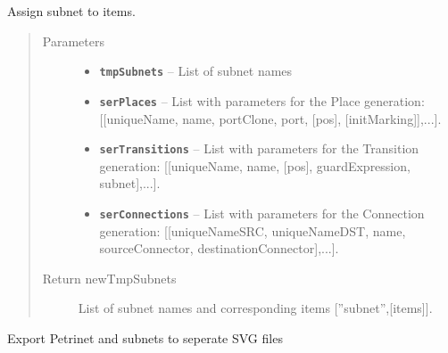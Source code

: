 \documentclass[a4paper,10pt,english]{sphinxmanual}
\begin{document}
\begin{fulllineitems}
\begin{fulllineitems}
\begin{quote}
\begin{description}
\end{description}\end{quote}

\end{fulllineitems}


\begin{fulllineitems}
\label{gui_link:gui.MainWindow.MainWindow.createSubnetItemLists}
Assign subnet to items.
\begin{quote}\begin{description}
\item[{Parameters}] \leavevmode\begin{itemize}
\item {} 
\textbf{\texttt{tmpSubnets}} -- List of subnet names

\item {} 
\textbf{\texttt{serPlaces}} -- List with parameters for the Place generation: {[}{[}uniqueName, name, portClone, port, {[}pos{]}, {[}initMarking{]}{]},...{]}.

\item {} 
\textbf{\texttt{serTransitions}} -- List with parameters for the Transition generation: {[}{[}uniqueName, name, {[}pos{]}, guardExpression, subnet{]},...{]}.

\item {} 
\textbf{\texttt{serConnections}} -- List with parameters for the Connection generation: {[}{[}uniqueNameSRC, uniqueNameDST, name, sourceConnector, destinationConnector{]},...{]}.

\end{itemize}

\item[{Return newTmpSubnets}] \leavevmode
List of subnet names and corresponding items {[}''subnet'',{[}items{]}{]}.

\end{description}\end{quote}

\end{fulllineitems}


\begin{fulllineitems}
\label{gui_link:gui.MainWindow.MainWindow.export_Step_as_SVG}
Export Petrinet and subnets to seperate SVG files


\end{fulllineitems}
\end{fulllineitems}
\end{document}
